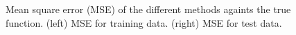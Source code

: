 \documentclass[]{interact}
\theoremstyle{plain}%
\theoremstyle{definition}
\theoremstyle{remark}
\begin{document}
\begin{figure}[H]
\centering
{}
\caption{Mean square error (MSE) of the different methods againts the true function. (left) MSE for training data. (right) MSE for test data.}
  \label{fig13_MSE_train_BF_gaydata}
\end{figure}
\end{document}
